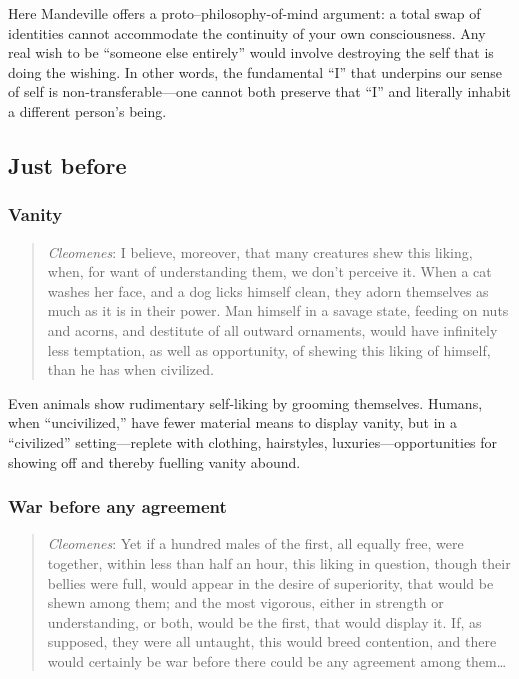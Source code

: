             Here Mandeville offers a proto–philosophy-of-mind argument: a total swap of identities cannot accommodate the continuity of your own consciousness. Any real wish to be “someone else entirely” would involve destroying the self that is doing the wishing. In other words, the fundamental “I” that underpins our sense of self is non-transferable—one cannot both preserve that “I” and literally inhabit a different person’s being.

    \subsection{Just before}

        \subsubsection{Vanity}

            \begin{quote}
                \textit{Cleomenes}: I believe, moreover, that many creatures shew this liking, when, for want of understanding them, we don’t perceive it. When a cat washes her face, and a dog licks himself clean, they adorn themselves as much as it is in their power. Man himself in a savage state, feeding on nuts and acorns, and destitute of all outward ornaments, would have infinitely less temptation, as well as opportunity, of shewing this liking of himself, than he has when civilized.
            \end{quote}

            \begin{remark}
                Even animals show rudimentary self-liking by grooming themselves. Humans, when “uncivilized,” have fewer material means to display vanity, but in a “civilized” setting—replete with clothing, hairstyles, luxuries—opportunities for showing off and thereby fuelling vanity abound.
            \end{remark}

        \subsubsection{War before any agreement}

            \begin{quote}
                \textit{Cleomenes}: Yet if a hundred males of the first, all equally free, were together, within less than half an hour, this liking in question, though their bellies were full, would appear in the desire of superiority, that would be shewn among them; and the most vigorous, either in strength or understanding, or both, would be the first, that would display it. If, as supposed, they were all untaught, this would breed contention, and there would certainly be war before there could be any agreement among them…
            \end{quote}

